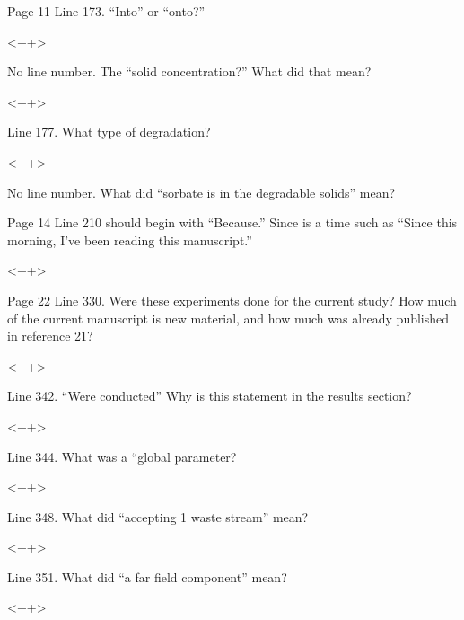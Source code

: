 \documentclass[answers,12pt]{exam}
\begin{document}
\begin{questions}
\question Page 11 Line 173. “Into” or “onto?”
\begin{solution}
<++>
\end{solution}

 

\question No line number. The “solid concentration?” What did that mean?
\begin{solution}
<++>
\end{solution}

 

\question Line 177. What type of degradation?
\begin{solution}
<++>
\end{solution}

 

\question No line number. What did “sorbate is in the degradable solids” mean?

 

\question Page 14 Line 210 should begin with “Because.” Since is a time such as “Since this morning, I’ve been reading this manuscript.”
\begin{solution}
<++>
\end{solution}

 

\question Page 22 Line 330. Were these experiments done for the current study? How much of the current manuscript is new material, and how much was already published in reference 21?
\begin{solution}
<++>
\end{solution}

 

\question Line 342. “Were conducted” Why is this statement in the results section?
\begin{solution}
<++>
\end{solution}

 

\question Line 344. What was a “global parameter?
\begin{solution}
<++>
\end{solution}

 

\question Line 348. What did “accepting 1 waste stream” mean?
\begin{solution}
<++>
\end{solution}

 

\question Line 351. What did “a far field component” mean?
\begin{solution}
<++>
\end{solution}


\end{questions}
\end{document}
